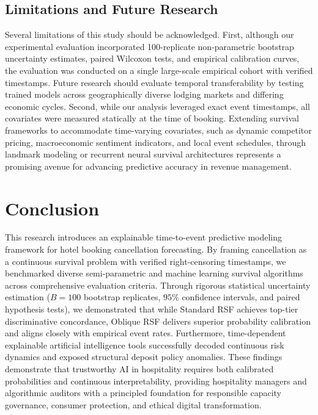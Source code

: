 \documentclass[pdflatex,iicol,sn-mathphys-ay]{sn-jnl}
\theoremstyle{thmstyleone}%
\theoremstyle{thmstyletwo}%
\theoremstyle{thmstylethree}%
\begin{document}
\subsection{Limitations and Future Research}
Several limitations of this study should be acknowledged. First, although our experimental evaluation incorporated 100-replicate non-parametric bootstrap uncertainty estimates, paired Wilcoxon tests, and empirical calibration curves, the evaluation was conducted on a single large-scale empirical cohort with verified timestamps. Future research should evaluate temporal transferability by testing trained models across geographically diverse lodging markets and differing economic cycles. Second, while our analysis leveraged exact event timestamps, all covariates were measured statically at the time of booking. Extending survival frameworks to accommodate time-varying covariates, such as dynamic competitor pricing, macroeconomic sentiment indicators, and local event schedules, through landmark modeling or recurrent neural survival architectures represents a promising avenue for advancing predictive accuracy in revenue management.

\section{Conclusion}
\label{sec:conclusion}

This research introduces an explainable time-to-event predictive modeling framework for hotel booking cancellation forecasting. By framing cancellation as a continuous survival problem with verified right-censoring timestamps, we benchmarked diverse semi-parametric and machine learning survival algorithms across comprehensive evaluation criteria. Through rigorous statistical uncertainty estimation ($B=100$ bootstrap replicates, $95\%$ confidence intervals, and paired hypothesis tests), we demonstrated that while Standard RSF achieves top-tier discriminative concordance, Oblique RSF delivers superior probability calibration and aligns closely with empirical event rates. Furthermore, time-dependent explainable artificial intelligence tools successfully decoded continuous risk dynamics and exposed structural deposit policy anomalies. These findings demonstrate that trustworthy AI in hospitality requires both calibrated probabilities and continuous interpretability, providing hospitality managers and algorithmic auditors with a principled foundation for responsible capacity governance, consumer protection, and ethical digital transformation.
\end{document}
